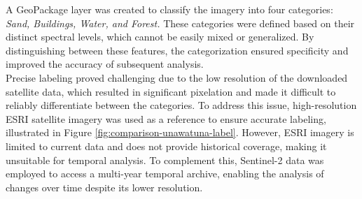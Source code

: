 \documentclass[a4paper,12pt]{article}
\begin{document}
A GeoPackage layer was created to classify the imagery into four categories: \textit{Sand, Buildings, Water, and Forest.} These categories were defined based on their distinct spectral levels, which cannot be easily mixed or generalized. By distinguishing between these features, the categorization ensured specificity and improved the accuracy of subsequent analysis.\\
Precise labeling proved challenging due to the low resolution of the downloaded satellite data, which resulted in significant pixelation and made it difficult to reliably differentiate between the categories. To address this issue, high-resolution ESRI satellite imagery was used as a reference to ensure accurate labeling, illustrated in Figure \ref{fig:comparison-unawatuna-label}. However, ESRI imagery is limited to current data and does not provide historical coverage, making it unsuitable for temporal analysis. To complement this, Sentinel-2 data was employed to access a multi-year temporal archive, enabling the analysis of changes over time despite its lower resolution.
\end{document}
